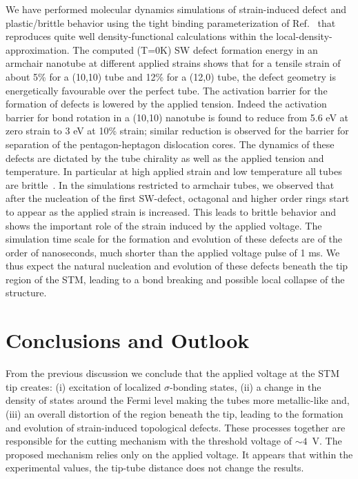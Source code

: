 \begin{multicols}{2}
We have performed molecular dynamics simulations of strain-induced
defect and plastic/brittle behavior using the tight binding
parameterization of Ref.~\cite{tbmd} that reproduces quite well
density-functional calculations within the
local-density-approximation\cite{md}. The computed (T=0K) SW
defect formation energy in an armchair nanotube at different
applied strains shows that for a tensile strain of about 5\% for a
(10,10) tube and 12\% for a (12,0) tube, the defect geometry is
energetically favourable over the perfect tube\cite{defect_paul}.
The activation barrier for the formation of defects is lowered by
the applied tension. Indeed the activation barrier for bond
rotation in a (10,10) nanotube is found to reduce from 5.6 eV at
zero strain to 3 eV at 10\% strain; similar reduction is observed
for the barrier for separation of the pentagon-heptagon
dislocation cores. The dynamics of these defects are dictated by
the tube chirality as well as the applied tension and temperature.
In particular at high applied strain and low temperature all tubes
are brittle~\cite{Marco}. In the simulations restricted to
armchair tubes, we observed that after the nucleation of the first
SW-defect, octagonal and higher order rings start to appear  as
the applied strain is increased. This leads to brittle behavior
and shows the important role of the strain induced by the applied
voltage. The simulation time scale for the formation and evolution
of these defects are of the order of nanoseconds, much shorter
than the applied voltage pulse of 1 ms. We thus expect the natural
nucleation and evolution of these defects beneath the tip region
of the STM, leading to a bond breaking and possible local collapse
of the structure.

\section{Conclusions and Outlook}

From the previous discussion we conclude that the applied voltage
at the STM tip creates: (i) excitation of localized
$\sigma$-bonding states, (ii) a change in the density of states
around the Fermi level making the tubes more metallic-like and,
(iii) an overall distortion of the region beneath the tip, leading
to the formation and evolution of strain-induced topological
defects. These processes together are responsible for the cutting
mechanism with the threshold voltage of $\sim 4$~V. The proposed
mechanism relies only on the applied voltage. It appears that
within the experimental values, the tip-tube distance does not
change the results.


\end{multicols}
